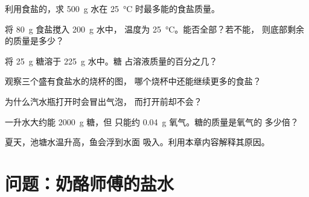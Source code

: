 \begin{exercise}[$\star\star$]\label{exo:g6:solutions-and-solubility:6}
利用食盐的，求
\qty{500}{g} 水在 \qty{25}{\celsius} 时最多能的食盐质量。
\end{exercise}

\begin{exercise}[$\star\star$]\label{exo:g6:solutions-and-solubility:7}
将 \qty{80}{g} 食盐搅入 \qty{200}{g} 水中，
温度为 \qty{25}{\celsius}。能否全部？若不能，
则底部剩余的质量是多少？
\end{exercise}

\begin{exercise}[$\star\star$]\label{exo:g6:solutions-and-solubility:8}
将 \qty{25}{g} 糖溶于 \qty{225}{g} 水中。糖
占溶液质量的百分之几？
\end{exercise}

\begin{exercise}[$\star\star$]\label{exo:g6:solutions-and-solubility:9}
观察三个盛有食盐水的烧杯的图，
哪个烧杯中还能继续更多的食盐？
\end{exercise}

\begin{exercise}[$\star\star$]\label{exo:g6:solutions-and-solubility:10}
为什么汽水瓶打开时会冒出气泡，
而打开前却不会？
\end{exercise}

\begin{exercise}[$\star\star\star$]\label{exo:g6:solutions-and-solubility:11}
一升水大约能 \qty{2000}{g} 糖，但
只能约 \qty{0.04}{g} 氧气。糖的质量是氧气的
多少倍？
\end{exercise}

\begin{exercise}[$\star\star\star$]\label{exo:g6:solutions-and-solubility:12}
夏天，池塘水温升高，鱼会浮到水面
吸入。利用本章内容解释其原因。
\end{exercise}

\section{问题：奶酪师傅的盐水}

